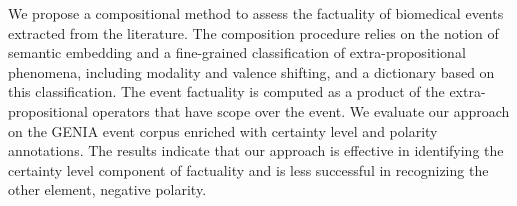 We propose a compositional method to assess the factuality of biomedical events extracted from the literature. The composition procedure relies on the notion of semantic embedding and a fine-grained classification of extra-propositional phenomena, including modality and valence shifting, and a dictionary based on this classification. The event factuality is computed as a product of the extra-propositional operators that have scope over the event. We evaluate our approach on the GENIA event corpus enriched with certainty level and polarity annotations. The results indicate that our approach is effective in identifying the certainty level component of factuality and is less successful in recognizing the other element, negative polarity.
